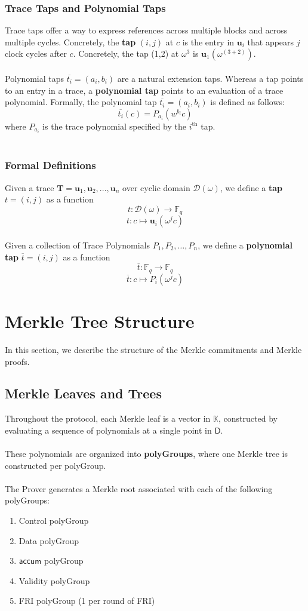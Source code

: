 \documentclass[10pt,letterpaper,titlepage]{article}
\newcommand{\GF}[1]{\mathbb{F}_{#1}}
\newcommand{\w}[0]{\omega}
\newcommand{\D}[0]{\mathcal{D}}
\theoremstyle{definition}
\begin{document}
\begin{appendices}
\subsubsection{Trace Taps and Polynomial Taps}
\label{taps}
Trace taps offer a way to express references across multiple blocks and across multiple cycles.
Concretely, the \textbf{tap} $(i,j)$ at $c$ is the entry in $\mathbf{u}_i$ that appears $j$ clock cycles after $c$.
Concretely, the tap (1,2) at $\w^3$ is $\mathbf{u}_1(\w^{(3+2)}).$\\
\\
Polynomial taps $\overline{t_i}=(a_i,b_i)$ are a natural extension taps. Whereas a tap points to an entry in a trace, a \textbf{polynomial tap} points to an evaluation of a trace polynomial.
Formally, the polynomial tap $\overline{t_i}=(a_i,b_i)$ is defined as follows:
\[\overline{t_i}(c)=P_{a_i}(w^{b_i}c)\]where $P_{a_i}$ is the trace polynomial specified by the $i^\text{th}$ tap. \\
\\
\subsubsection*{Formal Definitions}
Given a trace $\mathbf{T}=\mathbf{u}_1,\mathbf{u}_2,...,\mathbf{u}_n$ over cyclic domain $\D(\w)$, we define a \textbf{tap} $t=(i,j)$ as a function
\[t:\D(\w)\to\GF{q}\]
\[t:c\mapsto \mathbf{u}_i(\w^jc)\]
\\
Given a collection of Trace Polynomials $P_1,P_2,\ldots,P_n$, we define a \textbf{polynomial tap} $\overline{t}=(i,j)$ as a function
\[\overline{t}:\GF{q}\to\GF{q}\]
\[\overline{t}:c\mapsto P_i(\w^jc)\]



\section{Merkle Tree Structure}
\label{merkle}
In this section, we describe the structure of the Merkle commitments and Merkle proofs.

\subsection*{Merkle Leaves and Trees}
\label{polyGroup}
Throughout the protocol, each Merkle leaf is a vector in $\mathbb{K}$, constructed by evaluating a sequence of polynomials at a single point in $\mathsf{D}$. \\
\\
These polynomials are organized into \textbf{polyGroups}, where one Merkle tree is constructed per polyGroup. \\
\\
The Prover generates a Merkle root associated with each of the following polyGroups:
\begin{enumerate}
  \item Control polyGroup
  \item Data polyGroup
  \item $\mathsf{accum}$ polyGroup
  \item Validity polyGroup
  \item FRI polyGroup (1 per round of FRI)
\end{enumerate}

\end{appendices}
\end{document}
